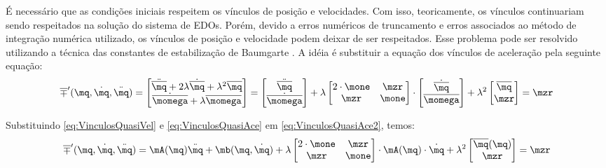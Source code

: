 \documentclass[]{politex}
\begin{document}
É necessário que as condições iniciais respeitem os vínculos de posição e velocidades. Com isso, teoricamente, os vínculos continuariam sendo respeitados na solução do sistema de EDOs. Porém, devido a erros numéricos de truncamento e erros associados ao método de integração numérica utilizado, os vínculos de posição e velocidade podem deixar de ser respeitados. Esse problema pode ser resolvido utilizando a técnica das constantes de estabilização de Baumgarte \cite{Baumgarte}. A idéia é substituir a equação dos vínculos de aceleração pela seguinte equação:
\begin{equation} \label{eq:VinculosQuasiAce2}
\overline{\mp}'(\mq, \dot{\mq}, \ddot{\mq}) =
\begin{bmatrix}
\ddot{\overline{\mq}} + 2\lambda \dot{\overline{\mq}} + \lambda^2 \overline{\mq} \\
\dot{\overline{\momega}} + \lambda \overline{\momega}
\end{bmatrix}
=
\begin{bmatrix}
\ddot{\overline{\mq}} \\
\dot{\overline{\momega}}
\end{bmatrix}
+
\lambda
\begin{bmatrix}
2 \cdot \mone & \mzr \\
\mzr & \mone
\end{bmatrix}
\cdot
\begin{bmatrix}
\dot{\overline{\mq}} \\
\overline{\momega}
\end{bmatrix}
+
\lambda^2
\begin{bmatrix}
\overline{\mq} \\
\mzr
\end{bmatrix}
= \mzr
\end{equation}

Substituindo \eqref{eq:VinculosQuasiVel} e \eqref{eq:VinculosQuasiAce} em \eqref{eq:VinculosQuasiAce2}, temos:
\begin{equation} \label{eq:VinculosQuasiAce3}
\overline{\mp}'(\mq, \dot{\mq}, \ddot{\mq}) =
\mA(\mq) \ddot{\mq} + \mb(\mq, \dot{\mq})
+
\lambda
\begin{bmatrix}
2 \cdot \mone & \mzr \\
\mzr & \mone
\end{bmatrix}
\cdot
\mA(\mq) \cdot \dot{\mq} +
\lambda^2
\begin{bmatrix}
\overline{\mq}(\mq) \\
\mzr
\end{bmatrix}
= \mzr
\end{equation}
\end{document}
